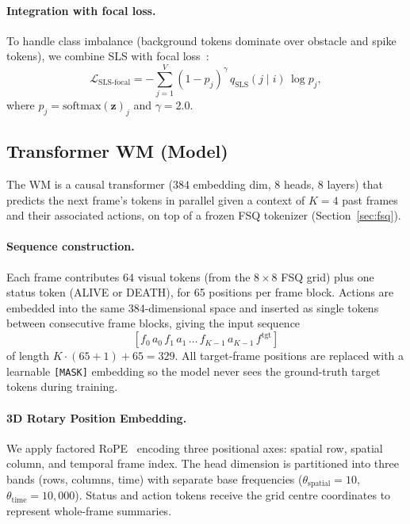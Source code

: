 \documentclass{article}
\newcommand{\hdim}{384}
\newcommand{\nheads}{8}
\newcommand{\nlayers}{8}
\newcommand{\nctx}{4}
\newcommand{\ntokens}{64}
\newcommand{\gridsize}{8 \times 8}
\newcommand{\focalgamma}{2.0}
\begin{document}
\paragraph{Integration with focal loss.}
To handle class imbalance (background tokens dominate over obstacle and spike tokens), we combine SLS with focal loss~\citep{lin2017focal}:
\begin{equation}
  \mathcal{L}_\text{SLS-focal} = -\sum_{j=1}^{V} (1 - p_j)^\gamma \, q_\text{SLS}(j \mid i) \, \log p_j,
  \label{eq:sls_focal}
\end{equation}
where $p_j = \text{softmax}(\mathbf{z})_j$ and $\gamma = \focalgamma$.

\subsection{Transformer WM (Model)}
\label{sec:transformer}

The WM is a causal transformer ($\hdim$ embedding dim, $\nheads$ heads, $\nlayers$ layers) that predicts the next frame's tokens in parallel given a context of $K = \nctx$ past frames and their associated actions, on top of a frozen FSQ tokenizer (Section~\ref{sec:fsq}).

\paragraph{Sequence construction.}
Each frame contributes $\ntokens$ visual tokens (from the $\gridsize$ FSQ grid) plus one status token (ALIVE or DEATH), for 65 positions per frame block.
Actions are embedded into the same $\hdim$-dimensional space and inserted as single tokens between consecutive frame blocks, giving the input sequence
\[
  [f_0\, a_0\, f_1\, a_1\, \dots\, f_{K-1}\, a_{K-1}\, f^{\text{tgt}}]
\]
of length $K \cdot (65 + 1) + 65 = 329$.
All target-frame positions are replaced with a learnable \texttt{[MASK]} embedding so the model never sees the ground-truth target tokens during training.

\paragraph{3D Rotary Position Embedding.}
We apply factored RoPE~\citep{su2024rope} encoding three positional axes: spatial row, spatial column, and temporal frame index.
The head dimension is partitioned into three bands (rows, columns, time) with separate base frequencies ($\theta_\text{spatial} = 10$, $\theta_\text{time} = 10{,}000$).
Status and action tokens receive the grid centre coordinates to represent whole-frame summaries.
\end{document}
